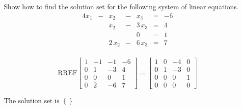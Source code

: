 
\begin{exerciseStatement}


Show how to find the solution set for the following system of linear equations. 
\begin{alignat*}{4} x_{1} &-& x_{2} &-& x_{3} &=& -6 \\ & & x_{2} &-& 3 \, x_{3} &=& 4 \\ & &  & & 0 &=& 1 \\ & & 2 \, x_{2} &-& 6 \, x_{3} &=& 7 \\ \end{alignat*}
            


\end{exerciseStatement}
    
\begin{exerciseAnswer} 
\[\mathrm{RREF} \left[\begin{array}{ccc|c}
1 & -1 & -1 & -6 \\
0 & 1 & -3 & 4 \\
0 & 0 & 0 & 1 \\
0 & 2 & -6 & 7
\end{array}\right]  =  \left[\begin{array}{ccc|c}
1 & 0 & -4 & 0 \\
0 & 1 & -3 & 0 \\
0 & 0 & 0 & 1 \\
0 & 0 & 0 & 0
\end{array}\right] \]

The solution set is \( \left\{\right\} \)


\end{exerciseAnswer}
    

